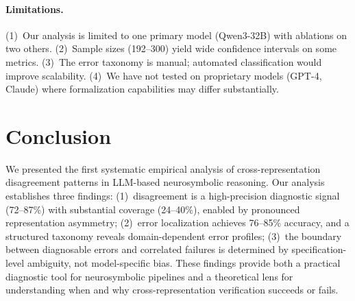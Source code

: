 \documentclass[11pt,a4paper]{article}
\begin{document}
\paragraph{Limitations.}
(1)~Our analysis is limited to one primary model (Qwen3-32B) with ablations on two others. (2)~Sample sizes (192--300) yield wide confidence intervals on some metrics. (3)~The error taxonomy is manual; automated classification would improve scalability. (4)~We have not tested on proprietary models (GPT-4, Claude) where formalization capabilities may differ substantially.

\section{Conclusion}
\label{sec:conclusion}

We presented the first systematic empirical analysis of cross-representation disagreement patterns in LLM-based neurosymbolic reasoning. Our analysis establishes three findings: (1)~disagreement is a high-precision diagnostic signal (72--87\%) with substantial coverage (24--40\%), enabled by pronounced representation asymmetry; (2)~error localization achieves 76--85\% accuracy, and a structured taxonomy reveals domain-dependent error profiles; (3)~the boundary between diagnosable errors and correlated failures is determined by specification-level ambiguity, not model-specific bias. These findings provide both a practical diagnostic tool for neurosymbolic pipelines and a theoretical lens for understanding when and why cross-representation verification succeeds or fails.
\end{document}
